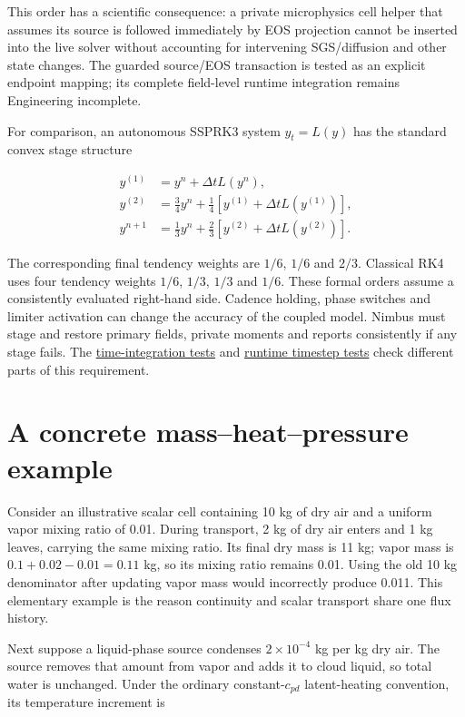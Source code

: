 \documentclass[
  11pt,
]{report}
\begin{document}
This order has a scientific consequence: a private microphysics cell
helper that assumes its source is followed immediately by EOS projection
cannot be inserted into the live solver without accounting for
intervening SGS/diffusion and other state changes. The guarded
source/EOS transaction is tested as an explicit endpoint mapping; its
complete field-level runtime integration remains Engineering incomplete.

For comparison, an autonomous SSPRK3 system \(y_t=L(y)\) has the
standard convex stage structure

\[\begin{aligned}
y^{(1)} &= y^n+\Delta tL(y^n), \\
y^{(2)} &= \tfrac34y^n+\tfrac14[y^{(1)}+\Delta tL(y^{(1)})], \\
y^{n+1} &= \tfrac13y^n+\tfrac23[y^{(2)}+\Delta tL(y^{(2)})].
\end{aligned}\]

The corresponding final tendency weights are \(1/6\), \(1/6\) and
\(2/3\). Classical RK4 uses four tendency weights \(1/6\), \(1/3\),
\(1/3\) and \(1/6\). These formal orders assume a consistently evaluated
right-hand side. Cadence holding, phase switches and limiter activation
can change the accuracy of the coupled model. Nimbus must stage and
restore primary fields, private moments and reports consistently if any
stage fails. The
\href{../tests/numerics/test_time_stepping.cpp}{time-integration tests}
and \href{../tests/numerics/test_runtime_timestep.cpp}{runtime timestep
tests} check different parts of this requirement.

\section{A concrete mass--heat--pressure
example}\label{a-concrete-massheatpressure-example}

Consider an illustrative scalar cell containing 10 kg of dry air and a
uniform vapor mixing ratio of 0.01. During transport, 2 kg of dry air
enters and 1 kg leaves, carrying the same mixing ratio. Its final dry
mass is 11 kg; vapor mass is \(0.1+0.02-0.01=0.11\) kg, so its mixing
ratio remains 0.01. Using the old 10 kg denominator after updating vapor
mass would incorrectly produce 0.011. This elementary example is the
reason continuity and scalar transport share one flux history.

Next suppose a liquid-phase source condenses \(2\times10^{-4}\) kg per
kg dry air. The source removes that amount from vapor and adds it to
cloud liquid, so total water is unchanged. Under the ordinary
constant-\(c_{pd}\) latent-heating convention, its temperature increment
is
\end{document}
